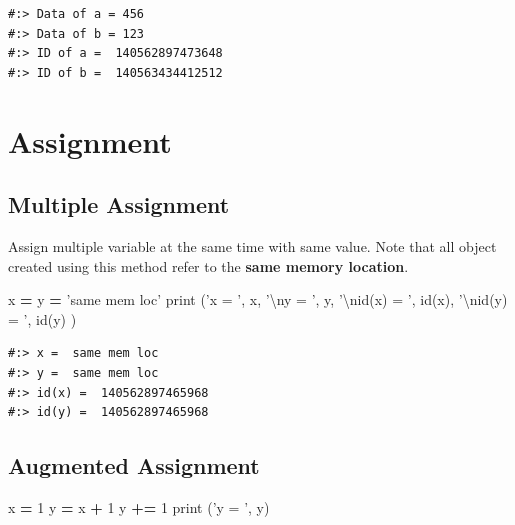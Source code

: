 \documentclass[
]{book}
\newenvironment{Shaded}{\begin{snugshade}}{\end{snugshade}}
\newcommand{\BuiltInTok}[1]{#1}
\newcommand{\CharTok}[1]{\textcolor[rgb]{0.5,0.5,0.5}{#1}}
\newcommand{\DecValTok}[1]{\textcolor[rgb]{0.06,0.06,0.06}{#1}}
\newcommand{\NormalTok}[1]{#1}
\newcommand{\OperatorTok}[1]{\textcolor[rgb]{0.43,0.43,0.43}{\textbf{#1}}}
\newcommand{\StringTok}[1]{\textcolor[rgb]{0.5,0.5,0.5}{#1}}
\begin{document}
\begin{verbatim}
#:> Data of a = 456 
#:> Data of b = 123 
#:> ID of a =  140562897473648 
#:> ID of b =  140563434412512
\end{verbatim}

\hypertarget{assignment}{%
\section{Assignment}\label{assignment}}

\hypertarget{multiple-assignment}{%
\subsection{Multiple Assignment}\label{multiple-assignment}}

Assign multiple variable at the same time with same value. Note that all object created using this method refer to the \textbf{same memory location}.

\begin{Shaded}
\begin{Highlighting}[]
\NormalTok{x }\OperatorTok{=}\NormalTok{ y }\OperatorTok{=} \StringTok{'same mem loc'}
\BuiltInTok{print}\NormalTok{ (}\StringTok{'x = '}\NormalTok{, x,}
     \StringTok{'}\CharTok{\textbackslash{}n}\StringTok{y = '}\NormalTok{, y,}
     \StringTok{'}\CharTok{\textbackslash{}n}\StringTok{id(x) = '}\NormalTok{, }\BuiltInTok{id}\NormalTok{(x), }
     \StringTok{'}\CharTok{\textbackslash{}n}\StringTok{id(y) = '}\NormalTok{, }\BuiltInTok{id}\NormalTok{(y)}
\NormalTok{)}
\end{Highlighting}
\end{Shaded}

\begin{verbatim}
#:> x =  same mem loc 
#:> y =  same mem loc 
#:> id(x) =  140562897465968 
#:> id(y) =  140562897465968
\end{verbatim}

\hypertarget{augmented-assignment}{%
\subsection{Augmented Assignment}\label{augmented-assignment}}

\begin{Shaded}
\begin{Highlighting}[]
\NormalTok{x }\OperatorTok{=} \DecValTok{1}
\NormalTok{y }\OperatorTok{=}\NormalTok{ x }\OperatorTok{+} \DecValTok{1}
\NormalTok{y }\OperatorTok{+=} \DecValTok{1}
\BuiltInTok{print}\NormalTok{ (}\StringTok{'y = '}\NormalTok{, y)}
\end{Highlighting}
\end{Shaded}
\end{document}

